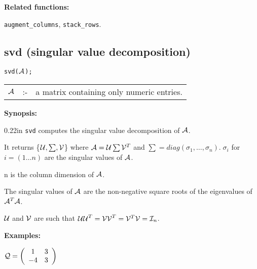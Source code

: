 {\bf Related functions:}

\hspace*{0.175in} {\tt augment\_columns}, {\tt stack\_rows}.


\subsection{svd (singular value decomposition)}


\hspace*{0.175in} {\tt svd(${\cal A}$);}

\hspace*{0.1in}  
\begin{tabular}{l l l} 
${\cal A}$ &:-& a matrix containing only numeric entries.
\end{tabular}

{\bf Synopsis:} %

\begin{addtolength}{\leftskip}{0.22in}
{\tt svd} computes the singular value decomposition of ${\cal A}$. 

It returns \{${\cal U},\sum,{\cal V}$\} where ${\cal A} = {\cal U} 
\sum {\cal V}^T$ and $\sum = diag(\sigma_{1}, \ldots ,\sigma_{n}). \; 
\sigma_{i}$ for $i= (1 \ldots n)$ are the singular values of ${\cal A}$.
 

n is the column dimension of ${\cal A}$.

The singular values of ${\cal A}$ are the non-negative square roots of 
the eigenvalues of ${\cal A}^T {\cal A}$. 

${\cal U}$ and ${\cal V}$ are such that ${\cal UU}^T = {\cal VV}^T = 
{\cal V}^T {\cal V} = {\cal I}_n$.

\end{addtolength}

{\bf Examples:}

\begin{flushleft}
\hspace*{0.175in}
\begin{math}  
{\cal Q} = \left( \begin{array}{cc} 1 & 3 \\ -4 & 3 
\end{array} \right)
\end{math}  
\end{flushleft}

